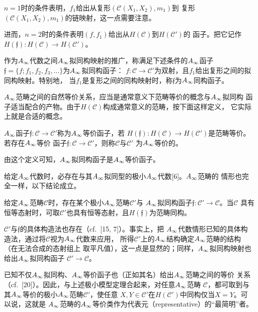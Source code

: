 
$n=1$时的条件表明，$f_{1}$给出从复形$(\mathcal{C}(X_{1},X_{2}),m_{1})$到
复形$(\mathcal{C}(X_{1},X_{2}),m_{1})$的链映射，这一点需要注意。


进而，$n=2$时的条件表明$(f,f_{1})$给出从$H(\mathcal{C})$到$H(\mathcal{C}')$的
函子。把它记作$H(\mathfrak{f}):H(\mathcal{C})\to H(\mathcal{C}')$。

作为$A_{\infty}$代数之间$A_{\infty}$拟同构映射的推广，称满足下述条件的$A_{\infty}$函子
$\mathfrak{f}=\{f;f_{1},f_{2},f_{3},\dots\}$为$A_{\infty}$拟同构函子：
$f:\mathcal{C}\to\mathcal{C}'$为双射，且$f_{1}$给出复形之间的拟同构映射。特别地，
当$f_{1}$是复形之间的同构映射时，称$\mathfrak{f}$为$A_{\infty}$同构函子。

$A_{\infty}$范畴之间的自然等价关系，应当是通常意义下范畴等价的概念与$A_{\infty}$拟同构
函子适当配合的产物。由于$H(\mathcal{C})$构成通常意义的范畴，按下面这样定义，
它实际上就是合适的概念。

\begin{definition}
  $A_{\infty}$函子$\mathfrak{f}:\mathcal{C}\to\mathcal{C}'$称为$A_{\infty}$等价函子，若
  $H(\mathfrak{f}):H(\mathcal{C})\to H(\mathcal{C}')$是范畴等价。若存在$A_{\infty}$等价
  函子$\mathfrak{f}:\mathcal{C}\to\mathcal{C}'$，则称$\mathcal{C}$与$\mathcal{C}'$
  为$A_{\infty}$等价的。
  \label{def:c01-2.2}
\end{definition}

由这个定义可知，$A_{\infty}$拟同构函子是$A_{\infty}$等价函子。

给定$A_{\infty}$代数时，必存在与其$A_{\infty}$拟同型的极小$A_{\infty}$代数[6]。$A_{\infty}$范畴的
情形也完全一样，以下结论成立。

\begin{theorem}
  给定$A_{\infty}$范畴$\mathcal{C}$时，存在某个极小$A_{\infty}$范畴$\mathcal{C}'$与
  $A_{\infty}$拟同构函子$\mathfrak{f}:\mathcal{C}'\to\mathcal{C}$。当$\mathcal{C}$
  具有恒等态射时，可取$\mathcal{C}'$也具有恒等态射，且$H(\mathfrak{f})$为范畴同构。
  \label{thm:c01-2.3}
\end{theorem}

$\mathcal{C}'$与$\mathfrak{f}$的具体构造法也存在（cf.\ [15, 7]）。事实上，把
$A_{\infty}$代数情形已知的具体构造法，通过将$\mathcal{C}$视为$A_{\infty}$代数来应用，
所得$\mathcal{C}'$上的$A_{\infty}$结构确定$A_{\infty}$范畴的结构（在无法合成的态射组上
取平凡值），这一点是显然的；同样，$A_{\infty}$拟同构映射也给出$A_{\infty}$拟同构函子
$\mathcal{C}'\to\mathcal{C}$。

已知不仅$A_{\infty}$拟同构、$A_{\infty}$等价函子也（正如其名）给出$A_{\infty}$范畴之间的等价
关系（cf.\ [20]）。因此，与上述极小模型定理合起来，对任意$A_{\infty}$范畴
$\mathcal{C}$，都可取到与其$A_{\infty}$等价的极小$A_{\infty}$范畴$\mathcal{C}'$，使任意
$X,Y\in\mathcal{C}'$在$H(\mathcal{C}')$中同构仅当$X=Y$。可以说，这就是
$A_{\infty}$范畴的$A_{\infty}$等价类作为代表元（representative）的“最简明”者。
